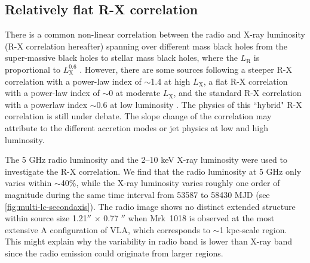 \documentclass[twocolumn]{aastex63}
\begin{document}
\subsection{Relatively flat R-X correlation}
There is a common non-linear correlation between the radio and X-ray luminosity (R-X correlation hereafter) spanning over different mass black holes from the super-massive black holes to stellar mass black holes, where the $L_\mathrm{R}$ is proportional to $L_\mathrm{X}^{0.6}$ \citep{2003MNRAS.345.1057M,2004A&A...414..895F}. However, there are some sources following a steeper R-X correlation with a power-law index of $\sim$1.4 at high $L_\mathrm{X}$, a flat R-X correlation with a power-law index of  $\sim$0 at moderate $L_\mathrm{X}$, and the standard R-X correlation with a powerlaw index $\sim$0.6 at low luminosity \cite[e.g.][]{2011MNRAS.414..677C,2014ApJ...788...52C,2016MNRAS.463.2287X}. The physics of this ``hybrid" R-X correlation is still under debate. The slope change of the correlation may attribute to the different accretion modes or jet physics at low and high luminosity\citep{2016MNRAS.456.4377X,2018MNRAS.481.4513I,2018MNRAS.473.4122E}. 

The 5 GHz radio luminosity and the 2--10 keV X-ray luminosity were used to investigate the R-X correlation. We find that the radio luminosity at 5 GHz only varies within $\sim$40\%, while the X-ray luminosity varies roughly one order of magnitude during the same time interval from 53587 to 58430 MJD (see \autoref{fig:multi-lc-secondaxis}). The radio image shows no distinct extended structure within source size 1.21$''$ $\times$ 0.77 $''$ when Mrk~1018 is observed at the most extensive A configuration of VLA, which corresponds to $\sim$1 kpc-scale region. This might explain why the variability in radio band is lower than X-ray band since the radio emission could originate from larger regions. 
\end{document}
